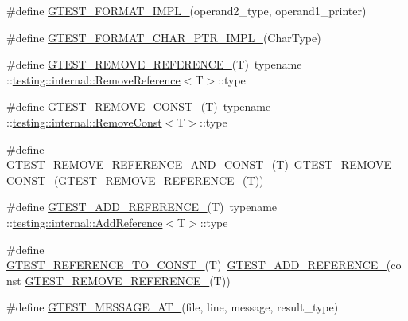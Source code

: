 \begin{DoxyCompactItemize}
\#define \hyperlink{fused-src_2gtest_2gtest_8h_a9d2f77d9ad16a7bb876b0bc41e15a88f}{\-G\-T\-E\-S\-T\-\_\-\-F\-O\-R\-M\-A\-T\-\_\-\-I\-M\-P\-L\-\_\-}(operand2\-\_\-type, operand1\-\_\-printer)
\item 
\#define \hyperlink{fused-src_2gtest_2gtest_8h_abd492da206ad86996a729e287fd0d303}{\-G\-T\-E\-S\-T\-\_\-\-F\-O\-R\-M\-A\-T\-\_\-\-C\-H\-A\-R\-\_\-\-P\-T\-R\-\_\-\-I\-M\-P\-L\-\_\-}(\-Char\-Type)
\item 
\#define \hyperlink{fused-src_2gtest_2gtest_8h_a84c72f25a6a6600e3ff8381ca6982ae9}{\-G\-T\-E\-S\-T\-\_\-\-R\-E\-M\-O\-V\-E\-\_\-\-R\-E\-F\-E\-R\-E\-N\-C\-E\-\_\-}(\-T)~typename \-::\hyperlink{structtesting_1_1internal_1_1RemoveReference}{testing\-::internal\-::\-Remove\-Reference}$<$\-T$>$\-::type
\item 
\#define \hyperlink{fused-src_2gtest_2gtest_8h_a2ffec8c60510eb130af387f5ce9a756a}{\-G\-T\-E\-S\-T\-\_\-\-R\-E\-M\-O\-V\-E\-\_\-\-C\-O\-N\-S\-T\-\_\-}(\-T)~typename \-::\hyperlink{structtesting_1_1internal_1_1RemoveConst}{testing\-::internal\-::\-Remove\-Const}$<$\-T$>$\-::type
\item 
\#define \hyperlink{fused-src_2gtest_2gtest_8h_a874567b176266188fabfffb8393267ce}{\-G\-T\-E\-S\-T\-\_\-\-R\-E\-M\-O\-V\-E\-\_\-\-R\-E\-F\-E\-R\-E\-N\-C\-E\-\_\-\-A\-N\-D\-\_\-\-C\-O\-N\-S\-T\-\_\-}(\-T)~\hyperlink{gtest-internal_8h_a2ffec8c60510eb130af387f5ce9a756a}{\-G\-T\-E\-S\-T\-\_\-\-R\-E\-M\-O\-V\-E\-\_\-\-C\-O\-N\-S\-T\-\_\-}(\hyperlink{gtest-internal_8h_a84c72f25a6a6600e3ff8381ca6982ae9}{\-G\-T\-E\-S\-T\-\_\-\-R\-E\-M\-O\-V\-E\-\_\-\-R\-E\-F\-E\-R\-E\-N\-C\-E\-\_\-}(\-T))
\item 
\#define \hyperlink{fused-src_2gtest_2gtest_8h_ab389953fc1f7e4efae30d182a0e0a13b}{\-G\-T\-E\-S\-T\-\_\-\-A\-D\-D\-\_\-\-R\-E\-F\-E\-R\-E\-N\-C\-E\-\_\-}(\-T)~typename \-::\hyperlink{structtesting_1_1internal_1_1AddReference}{testing\-::internal\-::\-Add\-Reference}$<$\-T$>$\-::type
\item 
\#define \hyperlink{fused-src_2gtest_2gtest_8h_a9f91fcd24cae0b48fdaeb19102dac525}{\-G\-T\-E\-S\-T\-\_\-\-R\-E\-F\-E\-R\-E\-N\-C\-E\-\_\-\-T\-O\-\_\-\-C\-O\-N\-S\-T\-\_\-}(\-T)~\hyperlink{gtest-internal_8h_ab389953fc1f7e4efae30d182a0e0a13b}{\-G\-T\-E\-S\-T\-\_\-\-A\-D\-D\-\_\-\-R\-E\-F\-E\-R\-E\-N\-C\-E\-\_\-}(const \hyperlink{gtest-internal_8h_a84c72f25a6a6600e3ff8381ca6982ae9}{\-G\-T\-E\-S\-T\-\_\-\-R\-E\-M\-O\-V\-E\-\_\-\-R\-E\-F\-E\-R\-E\-N\-C\-E\-\_\-}(\-T))
\item 
\#define \hyperlink{fused-src_2gtest_2gtest_8h_a8d70025c45a47a493780746dfd66d565}{\-G\-T\-E\-S\-T\-\_\-\-M\-E\-S\-S\-A\-G\-E\-\_\-\-A\-T\-\_\-}(file, line, message, result\-\_\-type)

\end{DoxyCompactItemize}
